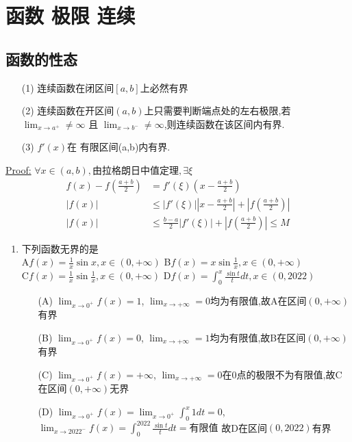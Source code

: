 \documentclass[12pt, a4paper, oneside, UTF8]{ctexbook}
\begin{document}
\else
\fi

\chapter{函数 极限 连续}
\section{函数的性态}
\begin{remark}[有界性的判定]
    \begin{enumerate}
    \item[(1)] 连续函数在闭区间$[a,b]$上必然有界 

    \item[(2)] 连续函数在开区间$(a,b)$上只需要判断端点处的左右极限,若$\lim_{x\to a^{+}}\neq \infty$ 且
    $\lim_{x\to b^{-}}\neq \infty$,则连续函数在该区间内有界.

    \item[(3)] $f'(x)$在{\color{red} 有限}区间(a,b)内有界.
    \end{enumerate}

    \underline{Proof:}
    $\forall x\in (a,b),\text{由拉格朗日中值定理},\exists\xi$ 
    \begin{align*}
        f(x)-f(\frac{a+b}{2}) &=f'(\xi)(x-\frac{a+b}{2}) \\
        \left|f(x)\right| &\leq \left|f'(\xi)\right|\left|x-\frac{a+b}{2}\right|+\left|f(\frac{a+b}{2})\right| \\
        \left|f(x)\right| &\leq \frac{b-a}{2}\left|f'(\xi)\right|+\left|f(\frac{a+b}{2})\right| \leq M
    \end{align*}
\end{remark}

\begin{enumerate}[label=\arabic*.]
    \item  下列函数无界的是 \\
    A\quad $f(x)=\frac{1}{x}\sin x, x\in(0,+\infty)$\qquad
    B\quad $f(x)=x\sin\frac{1}{x}, x\in(0,+\infty)$ \\
    C\quad $f(x)=\frac{1}{x}\sin\frac{1}{x}, x\in(0,+\infty)$ \qquad
    D\quad $f(x)=\int_0^x\frac{\sin t}{t} dt, x\in(0,2022)$
    
    \begin{solution}
        \begin{enumerate}
        \item[(A)] $\lim_{x\to 0^{+}}f(x)=1$, $\lim_{x\to +\infty}=0$均为有限值,故A在区间$(0, +\infty)$有界
        \item[(B)] $\lim_{x\to 0^{+}}f(x)=0$, $\lim_{x\to +\infty}=1$均为有限值,故B在区间$(0, +\infty)$有界
        \item[(C)] $\lim_{x\to 0^{+}}f(x)=+\infty$, $\lim_{x\to +\infty}=0$在0点的极限不为有限值,故C在区间$(0, +\infty)$无界
        \item[(D)] $\lim_{x\to 0^{+}}f(x)=\lim_{x\to 0^{+}}\int_{0}^{x}1dt=0$, 
        $\lim_{x\to 2022^{-}}f(x)=\int_{0}^{2022}\frac{\sin{t}}{t}dt=\text{有限值}$ 故D在区间$(0, 2022)$有界
        \end{enumerate}
    \end{solution}
\end{enumerate}
\end{document}
